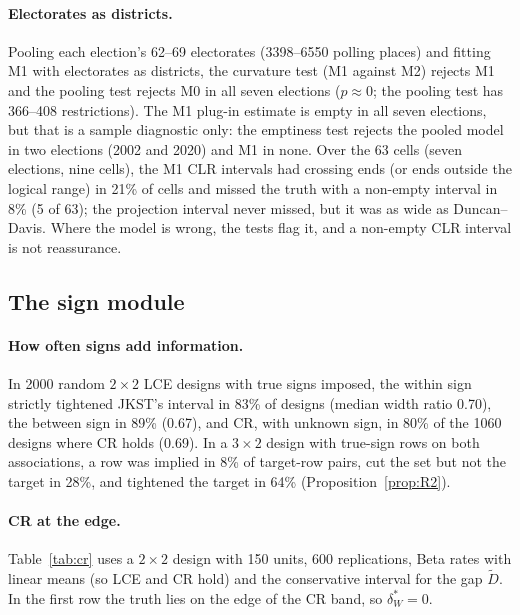 \paragraph{Electorates as districts.} Pooling each election's 62--69 electorates
(3398--6550 polling places) and fitting M1 with electorates as districts, the
curvature test (M1 against M2) rejects M1 and the pooling test rejects M0 in all seven
elections ($p\approx0$; the pooling test has 366--408 restrictions). The M1 plug-in
estimate is empty in all seven elections, but that is a sample diagnostic only: the
emptiness test rejects the pooled model in two elections (2002 and 2020) and M1 in
none. Over the 63 cells (seven elections, nine cells), the M1 CLR
intervals had crossing ends (or ends outside the logical range) in 21\% of cells and missed the truth with a non-empty
interval in 8\% (5 of 63); the projection interval never missed, but it was as wide
as Duncan--Davis. Where the model is wrong, the tests flag it, and a non-empty CLR
interval is not reassurance.

\subsection{The sign module}

\paragraph{How often signs add information.} In 2000 random $2\times2$ LCE designs
with true signs imposed, the within sign strictly tightened JKST's interval in 83\%
of designs (median width ratio 0.70), the between sign in 89\% (0.67), and CR, with
unknown sign, in 80\% of the 1060 designs where CR holds (0.69). In a $3\times2$
design with true-sign rows on both associations, a row was implied in 8\% of
target-row pairs, cut the set but not the target in 28\%, and tightened the target in
64\% (Proposition~\ref{prop:R2}).

\paragraph{CR at the edge.} Table~\ref{tab:cr} uses a $2\times2$ design with 150
units, 600 replications, Beta rates with linear means (so LCE and CR hold) and the
conservative interval for the gap $\tilde D$. In the first row the truth lies on the
edge of the CR band, so $\delta^*_W=0$.

